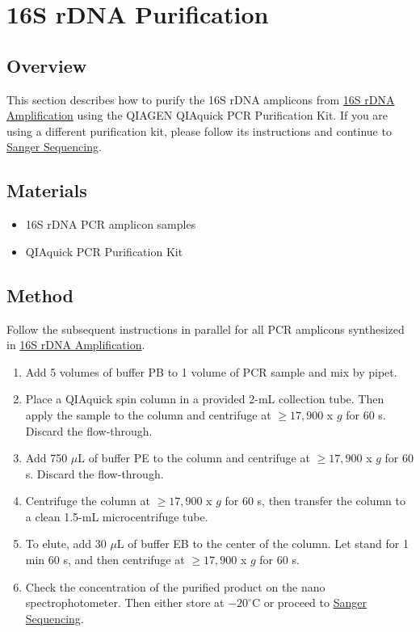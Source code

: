 \documentclass[twocolumn]{article}
\begin{document}
\section{16S rDNA Purification}\label{1rP}
\subsection{Overview}
This section describes how to purify the 16S rDNA amplicons from \hyperref[1rA]{16S rDNA Amplification} using the QIAGEN QIAquick PCR Purification Kit.
If you are using a different purification kit,
please follow its instructions and continue to \hyperref[SS]{Sanger Sequencing}.

\subsection{Materials}
\begin{itemize}
  \item 16S rDNA PCR amplicon samples
  \item QIAquick PCR Purification Kit
\end{itemize}

\subsection{Method}
Follow the subsequent instructions in parallel for all PCR amplicons synthesized in \hyperref[1rA]{16S rDNA Amplification}.
\begin{enumerate}
  \item Add 5 volumes of buffer PB to 1 volume of PCR sample and mix by pipet.
  \item Place a QIAquick spin column in a provided 2-mL collection tube. Then apply the sample to the column and centrifuge at $\geq17,900$ x $g$ for 60 s. Discard the flow-through.
  \item Add 750 $\mu$L of buffer PE to the column and centrifuge at $\geq17,900$ x $g$ for 60 s. Discard the flow-through.
  \item Centrifuge the column at $\geq17,900$ x $g$ for 60 s, then transfer the column to a clean 1.5-mL microcentrifuge tube.
  \item To elute, add 30 $\mu$L of buffer EB to the center of the column. Let stand for 1 min 60 s, and then centrifuge at $\geq17,900$ x $g$ for 60 s.
  \item Check the concentration of the purified product on the nano spectrophotometer. Then either store at $-20^\circ$C or proceed to \hyperref[SS]{Sanger Sequencing}.
\end{enumerate}
\end{document}
